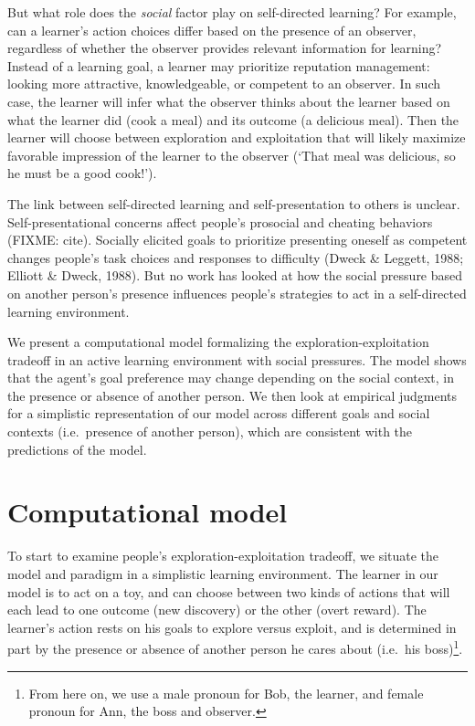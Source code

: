 \documentclass[10pt, letterpaper]{article}
\begin{document}
But what role does the \emph{social} factor play on self-directed
learning? For example, can a learner's action choices differ based on
the presence of an observer, regardless of whether the observer provides
relevant information for learning? Instead of a learning goal, a learner
may prioritize reputation management: looking more attractive,
knowledgeable, or competent to an observer. In such case, the learner
will infer what the observer thinks about the learner based on what the
learner did (cook a meal) and its outcome (a delicious meal). Then the
learner will choose between exploration and exploitation that will
likely maximize favorable impression of the learner to the observer
(`That meal was delicious, so he must be a good cook!').

The link between self-directed learning and self-presentation to others
is unclear. Self-presentational concerns affect people's prosocial and
cheating behaviors (FIXME: cite). Socially elicited goals to prioritize
presenting oneself as competent changes people's task choices and
responses to difficulty (Dweck \& Leggett, 1988; Elliott \& Dweck,
1988). But no work has looked at how the social pressure based on
another person's presence influences people's strategies to act in a
self-directed learning environment.

We present a computational model formalizing the
exploration-exploitation tradeoff in an active learning environment with
social pressures. The model shows that the agent's goal preference may
change depending on the social context, in the presence or absence of
another person. We then look at empirical judgments for a simplistic
representation of our model across different goals and social contexts
(i.e.~presence of another person), which are consistent with the
predictions of the model.

\section{Computational model}\label{computational-model}

To start to examine people's exploration-exploitation tradeoff, we
situate the model and paradigm in a simplistic learning environment. The
learner in our model is to act on a toy, and can choose between two
kinds of actions that will each lead to one outcome (new discovery) or
the other (overt reward). The learner's action rests on his goals to
explore versus exploit, and is determined in part by the presence or
absence of another person he cares about (i.e.~his
boss)\footnote{From here on, we use a male pronoun for Bob, the learner, and female pronoun for Ann, the boss and observer.}.
\end{document}
